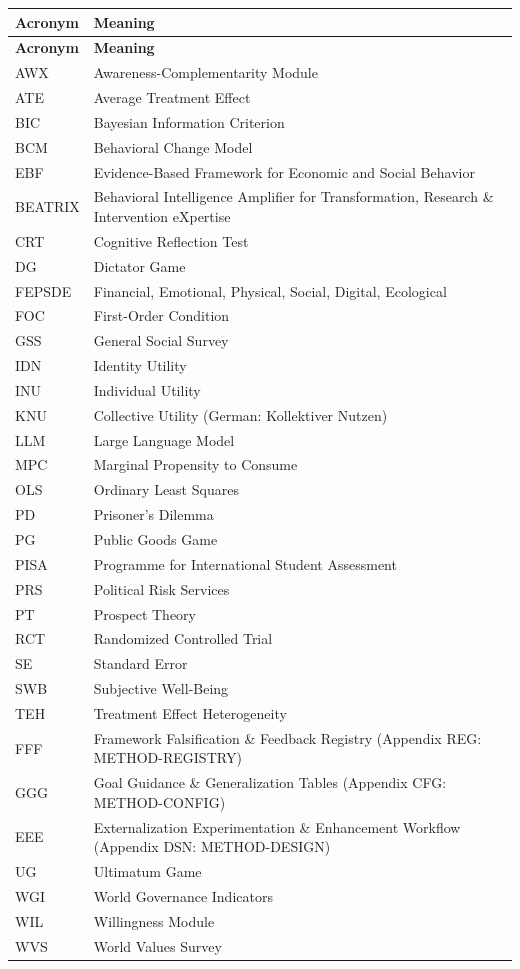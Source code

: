 \begin{center}
\renewcommand{\arraystretch}{1.2}
\begin{longtable}{lp{10cm}}
\hline
\textbf{Acronym} & \textbf{Meaning} \\
\hline
\endfirsthead
\hline
\textbf{Acronym} & \textbf{Meaning} \\
\hline
\endhead
\hline
\endfoot

AWX & Awareness-Complementarity Module \\
ATE & Average Treatment Effect \\
BIC & Bayesian Information Criterion \\
BCM & Behavioral Change Model \\
EBF & Evidence-Based Framework for Economic and Social Behavior \\
BEATRIX & Behavioral Intelligence Amplifier for Transformation, Research \& Intervention eXpertise \\
CRT & Cognitive Reflection Test \\
DG & Dictator Game \\
FEPSDE & Financial, Emotional, Physical, Social, Digital, Ecological \\
FOC & First-Order Condition \\
GSS & General Social Survey \\
IDN & Identity Utility \\
INU & Individual Utility \\
KNU & Collective Utility (German: Kollektiver Nutzen) \\
LLM & Large Language Model \\
MPC & Marginal Propensity to Consume \\
OLS & Ordinary Least Squares \\
PD & Prisoner's Dilemma \\
PG & Public Goods Game \\
PISA & Programme for International Student Assessment \\
PRS & Political Risk Services \\
PT & Prospect Theory \\
RCT & Randomized Controlled Trial \\
SE & Standard Error \\
SWB & Subjective Well-Being \\
TEH & Treatment Effect Heterogeneity \\
FFF & Framework Falsification \& Feedback Registry (Appendix REG: METHOD-REGISTRY) \\
GGG & Goal Guidance \& Generalization Tables (Appendix CFG: METHOD-CONFIG) \\
EEE & Externalization Experimentation \& Enhancement Workflow (Appendix DSN: METHOD-DESIGN) \\
UG & Ultimatum Game \\
WGI & World Governance Indicators \\
WIL & Willingness Module \\
WVS & World Values Survey \\
\hline

\end{longtable}
\end{center}

